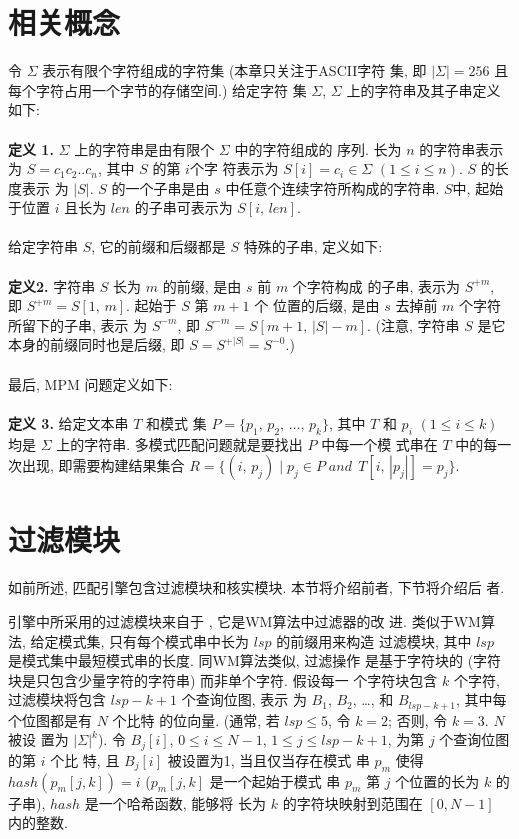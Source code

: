 \documentclass{ws-ijprai}
\begin{document}
\section{相关概念}
\label{sec:notations}

令 $\Sigma$ 表示有限个字符组成的字符集 (本章只关注于ASCII字符
集, 即 $|\Sigma| = 256$ 且每个字符占用一个字节的存储空间.)  给定字符
集 $\Sigma$, $\Sigma$ 上的字符串及其子串定义如下:\\
\\
\textbf{定义 1.}  $\Sigma$ 上的字符串是由有限个 $\Sigma$ 中的字符组成的
序列. 长为 $n$ 的字符串表示为 $S = c_1c_2..c_n$, 其中 $S$ 的第 $i$个字
符表示为 $S[i] = c_i \in \Sigma$ $(1 \leq i \leq n)$.  $S$ 的长度表示
为 $|S|$. $S$ 的一个子串是由 $s$ 中任意个连续字符所构成的字符串.  $S$中,
起始于位置 $i$ 且长为 $len$ 的子串可表示为 $S[i,\,len]$.\\
\\
给定字符串 $S$, 它的前缀和后缀都是 $S$ 特殊的子串, 定义如下:\\
\\
\textbf{定义2.} 字符串 $S$ 长为 $m$ 的前缀, 是由 $s$ 前 $m$ 个字符构成
的子串, 表示为 $S^{+m}$, 即 $S^{+m}=S[1,\,m]$.  起始于 $S$ 第 $m+1$ 个
位置的后缀, 是由 $s$ 去掉前 $m$ 个字符所留下的子串, 表示
为 $S^{-m}$, 即 $S^{-m} = S[m+1,\,|S|-m]$. (注意, 字符串 $S$
是它本身的前缀同时也是后缀, 即 $S=S^{+|S|}=S^{-0}$.)\\
\\
最后, MPM 问题定义如下: \\
\\
\textbf{定义 3.} 给定文本串 $T$ 和模式
集 $P=\{p_1,\,p_2,\,\dots,\,p_k\}$, 其中 $T$ 和 $p_i$ $(1 \leq i \leq
k)$ 均是 $\Sigma$ 上的字符串. 多模式匹配问题就是要找出 $P$ 中每一个模
式串在 $T$ 中的每一次出现, 即需要构建结果集合
$R = \{(i,\, p_j)\;|\; p_j \in P\; and\,\; T[i,\,|p_j|]=p_j\}$.


\section{过滤模块}
\label{sec:filter}

如前所述, 匹配引擎包含过滤模块和核实模块. 本节将介绍前者, 下节将介绍后
者.

引擎中所采用的过滤模块来自于 \cite{Lee2013}, 它是WM算法中过滤器的改
进. 类似于WM算法, 给定模式集, 只有每个模式串中长为 $lsp$ 的前缀用来构造
过滤模块, 其中 $lsp$ 是模式集中最短模式串的长度. 同WM算法类似, 过滤操作
是基于字符块的 (字符块是只包含少量字符的字符串) 而非单个字符. 假设每一
个字符块包含 $k$ 个字符, 过滤模块将包含 $lsp-k+1$ 个查询位图, 表示
为 $B_1$, $B_2$, \dots, 和 $B_{lsp-k+1}$, 其中每个位图都是有 $N$ 个比特
的位向量.  (通常, 若 $lsp \leq 5$, 令 $k = 2$; 否则, 令 $k=3$. $N$ 被设
置为 $|\Sigma|^k$). 令 $B_j[i]$, $0 \leq i \leq N - 1$,
$1 \leq j \leq lsp-k+1$, 为第 $j$ 个查询位图的第 $i$ 个比
特, 且 $B_j[i]$ 被设置为1, 当且仅当存在模式
串 $p_m$ 使得 $hash(p_m[j,k]) = i$ ($p_m[j,k]$ 是一个起始于模式
串 $p_m$ 第 $j$ 个位置的长为 $k$ 的子串), $hash$ 是一个哈希函数, 能够将
长为 $k$ 的字符块映射到范围在 $[0, N-1]$ 内的整数.
\end{document}
